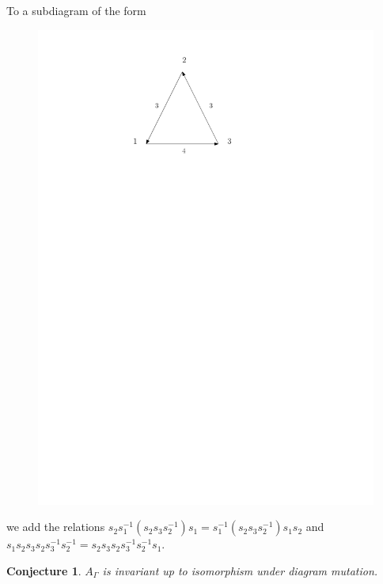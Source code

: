 \documentclass{beamer}
\newtheorem{Conjecture}{Conjecture}
\begin{document}
\begin{frame}
To a subdiagram of the form
\begin{figure}
\includegraphics[scale = .50]{Diagram5.pdf}
\end{figure}
we add the relations $s_{2}s_{1}^{-1}(s_{2}s_{3}s_{2}^{-1})s_{1} = s_{1}^{-1}(s_{2}s_{3}s_{2}^{-1})s_{1}s_{2}$ and $s_{1}s_{2}s_{3}s_{2}s_{3}^{-1}s_{2}^{-1} = s_{2}s_{3}s_{2}s_{3}^{-1}s_{2}^{-1}s_{1}$.
\end{frame}

\begin{frame}
\begin{Conjecture}
$A_{\Gamma}$ is invariant up to isomorphism under diagram mutation.
\end{Conjecture}
\end{frame}
\end{document}
